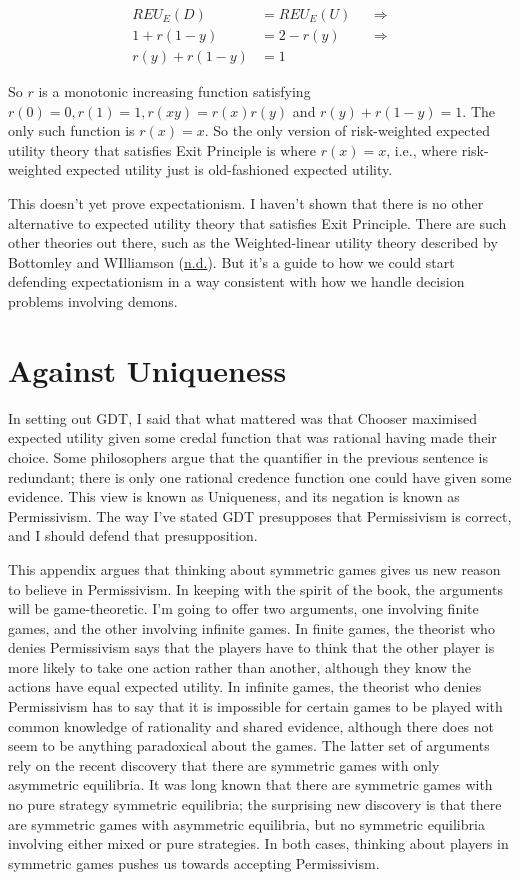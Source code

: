 \documentclass[
  12pt,
  letterpaper,
  DIV=11,
  numbers=noendperiod]{scrreprt}
\begin{document}
\begin{align*}
REU_E(D) &= REU_E(U)  && \Rightarrow \\
1 + r(1-y) &= 2 - r(y) && \Rightarrow \\
r(y) + r(1-y) &= 1
\end{align*}

So \(r\) is a monotonic increasing function satisfying
\(r(0) = 0, r(1) = 1, r(xy) = r(x)r(y)\) and \(r(y) + r(1-y) = 1\). The
only such function is \(r(x) = x\). So the only version of risk-weighted
expected utility theory that satisfies Exit Principle is where
\(r(x) = x\), i.e., where risk-weighted expected utility just is
old-fashioned expected utility.

This doesn't yet prove expectationism. I haven't shown that there is no
other alternative to expected utility theory that satisfies Exit
Principle. There are such other theories out there, such as the
Weighted-linear utility theory described by Bottomley and WIlliamson
(\protect\hyperlink{ref-BottomleyWilliamsonnd}{n.d.}). But it's a guide
to how we could start defending expectationism in a way consistent with
how we handle decision problems involving demons.

\hypertarget{sec-unique}{%
\chapter{Against Uniqueness}\label{sec-unique}}

In setting out GDT, I said that what mattered was that Chooser maximised
expected utility given some credal function that was rational having
made their choice. Some philosophers argue that the quantifier in the
previous sentence is redundant; there is only one rational credence
function one could have given some evidence. This view is known as
Uniqueness, and its negation is known as Permissivism. The way I've
stated GDT presupposes that Permissivism is correct, and I should defend
that presupposition.

This appendix argues that thinking about symmetric games gives us new
reason to believe in Permissivism. In keeping with the spirit of the
book, the arguments will be game-theoretic. I'm going to offer two
arguments, one involving finite games, and the other involving infinite
games. In finite games, the theorist who denies Permissivism says that
the players have to think that the other player is more likely to take
one action rather than another, although they know the actions have
equal expected utility. In infinite games, the theorist who denies
Permissivism has to say that it is impossible for certain games to be
played with common knowledge of rationality and shared evidence,
although there does not seem to be anything paradoxical about the games.
The latter set of arguments rely on the recent discovery that there are
symmetric games with only asymmetric equilibria. It was long known that
there are symmetric games with no pure strategy symmetric equilibria;
the surprising new discovery is that there are symmetric games with
asymmetric equilibria, but no symmetric equilibria involving either
mixed or pure strategies. In both cases, thinking about players in
symmetric games pushes us towards accepting Permissivism.
\end{document}
